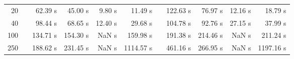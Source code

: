 {\begin{table}[h]
\begin{tabular}{rr rrrr r rrrr}
20 & & 62.39 s & 45.00 s & 9.80 s & 11.49 s && 122.63 s & 76.97 s & 12.16 s & 18.79 s \\ 
40 & & 98.44 s & 68.65 s & 12.40 s & 29.68 s && 104.78 s & 92.76 s & 27.15 s & 37.99 s \\ 
100 & & 134.71 s & 154.30 s &  NaN s & 159.98 s && 191.38 s & 214.46 s &  NaN s & 211.24 s \\ 
250 & & 188.62 s & 231.45 s &  NaN s & 1114.57 s && 461.16 s & 266.95 s &  NaN s & 1197.16 s \\ 
\hline 
\end{tabular} 
\end{table} 
} 

